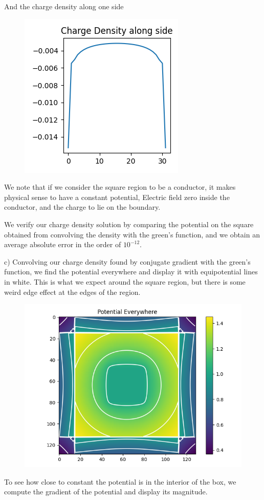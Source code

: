 \documentclass[]{article}
\begin{document}
And the charge density along one side

\begin{figure}[h!]
	\centering
	\includegraphics[width=0.25\linewidth]{../Results/2b2.png}
\end{figure}

We note that if we consider the square region to be a conductor, it makes physical sense to have a constant potential, Electric field zero inside the conductor, and the charge to lie on the boundary.

We verify our charge density solution by comparing the potential on the square obtained from convolving the density with the green's function, and we obtain an average absolute error in the order of $10^{-12}$.

\newpage

c)
Convolving our charge density found by conjugate gradient with the green's function, we find the potential everywhere and display it with equipotential lines in white. This is what we expect around the square region, but there is some weird edge effect at the edges of the region.

\begin{figure}[h!]
	\centering
	\includegraphics[width=0.5\linewidth]{../Results/2c1.png}
\end{figure}

To see how close to constant the potential is in the interior of the box, we compute the gradient of the potential and display its magnitude. 
\end{document}
